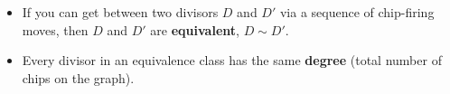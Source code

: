 \documentclass[mathserif, serif, xcolor=dvipsnames]{beamer}
\begin{document}
\begin{frame}
\begin{center}
\end{center}


\begin{itemize}

\item[] {\color{white}
If you can get between two divisors $D$ and $D'$ via a sequence of
chip-firing moves, then $D$ and $D'$ are \textbf{equivalent}, $D\sim D'$.}

\item[] {\color{white}
Every divisor in an equivalence class has the same
  \textbf{degree} (total number of chips on the graph).}

\end{itemize}

\end{frame}
\end{document}
